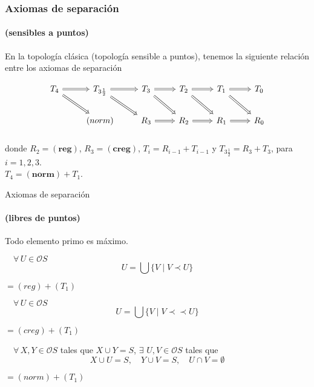 \documentclass[compress,12pt]{beamer}
\begin{document}
\begin{frame}[fragile]
      \frametitle{Axiomas de separación}
      \framesubtitle{(sensibles a puntos)}
      En la topología clásica (topología sensible a puntos), tenemos la siguiente relación entre los axiomas de separación 

    \[\begin{tikzcd}
	{T_4} & {T_{3\frac{1}{2}}} & {T_3} & {T_2} & {T_1} & {T_0} \\
	& {(norm)} & {R_3} & {R_2} & {R_1} & {R_0}
	\arrow[Rightarrow, from=1-2, to=1-3]
	\arrow[Rightarrow, from=1-3, to=1-4]
	\arrow[Rightarrow, from=1-4, to=1-5]
	\arrow[Rightarrow, from=1-5, to=1-6]
	\arrow[Rightarrow, from=1-1, to=1-2]
	\arrow[Rightarrow, from=1-1, to=2-2]
	\arrow[Rightarrow, from=1-2, to=2-3]
	\arrow[Rightarrow, from=1-3, to=2-4]
	\arrow[Rightarrow, from=1-4, to=2-5]
	\arrow[Rightarrow, from=1-5, to=2-6]
	\arrow[Rightarrow, from=2-3, to=2-4]
	\arrow[Rightarrow, from=2-4, to=2-5]
	\arrow[Rightarrow, from=2-5, to=2-6]
\end{tikzcd}\]
\[
    \mbox{ }
\]
    
donde $R_2=\mathbf{(reg)}$, $R_3=\mathbf{(creg)}$, $T_i=R_{i-1}+T_{i-1}$ y $T_{3\frac{1}{2}}=R_3+T_3$, para $i=1, 2, 3$.\\

$T_4=\mathbf{(norm)}+T_1$.
    
\end{frame}

\begin{frame}{Axiomas de separación}
\framesubtitle{(libres de puntos)}
    \begin{description}
    \item[$(T_1)$] Todo elemento primo es máximo.
    \item<2->[$(reg)$] $\quad\forall\, U\in \mathcal{O}S$
    \[
    U=\bigcup\{V\mid V\prec U\}
    \]
    \item<3->[$(T_3)$] $=(reg)+(T_{1})$ 
    \item<4->[$(creg)$] $\quad\forall\, U\in \mathcal{O}S$
    \[
    U=\bigcup\{V\mid V\prec\prec U\}
    \]
    \item<5->[$(T_{3\frac{1}{2}})$] $=(creg)+(T_{1})$ 
    \item<6->[$(norm)$] $\quad\forall\, X, Y \in \mathcal{O}S$ tales que $X\cup Y=S$, $\exists$ $U, V \in \mathcal{O}S$ tales que
    \[
    X\cup U=S, \quad Y\cup V=S, \quad U\cap V=\emptyset
    \]
    \item<7->[$(T_{4})$] $=(norm)+(T_{1})$ 
\end{description}
\end{frame}
\end{document}
